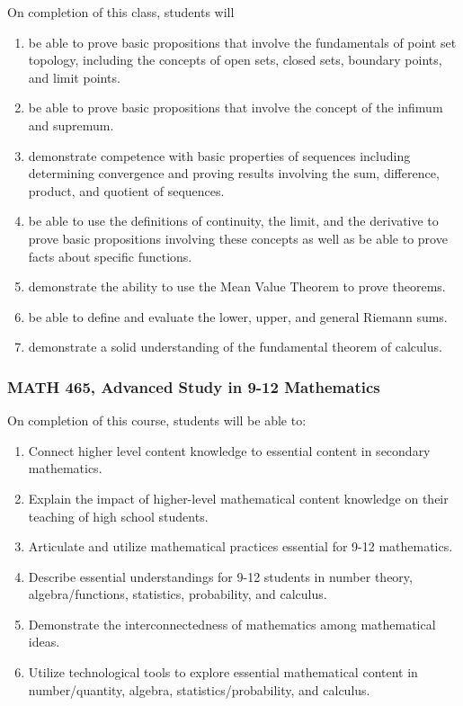 \documentclass[11pt]{article}
\newenvironment{alphalist}{
\begin{enumerate}[label=(\arabic*),widest=107 ,leftmargin=25pt, itemsep=0pt]}
{\end{enumerate}}
\begin{document}
On completion of this class, students will
\begin{alphalist}
    \item be able to prove basic propositions that involve the fundamentals of point set topology, including the concepts of open sets, closed sets, boundary points, and limit points.
     \item be able to prove basic propositions that involve the concept of the infimum and supremum. 
    \item demonstrate competence with basic properties of sequences including determining convergence and proving results involving the sum, difference, product, and quotient of sequences.
    \item be able to use the definitions of continuity, the limit, and the derivative to prove basic propositions involving these concepts as well as be able to prove facts about specific functions.
    \item demonstrate the ability to use the Mean Value Theorem to prove theorems. 
    \item be able to define and evaluate the lower, upper, and general Riemann sums.
    \item demonstrate a solid understanding of the fundamental theorem of calculus.
\end{alphalist}

\subsubsection*{MATH 465, Advanced Study in 9-12 Mathematics}

On  completion of this course, students will be able to:
\begin{alphalist}

\item Connect higher level content knowledge to essential content in secondary mathematics.
\item Explain the impact of higher-level mathematical content knowledge on their teaching of high school students.
\item Articulate and utilize mathematical practices essential for 9-12 mathematics.
\item Describe essential understandings for 9-12 students in number theory, algebra/functions, statistics, probability, and calculus.
\item Demonstrate the interconnectedness of mathematics among mathematical ideas.
\item Utilize technological tools to explore essential mathematical content in number/quantity, algebra, statistics/probability, and calculus.
\end{alphalist}
\end{document}
